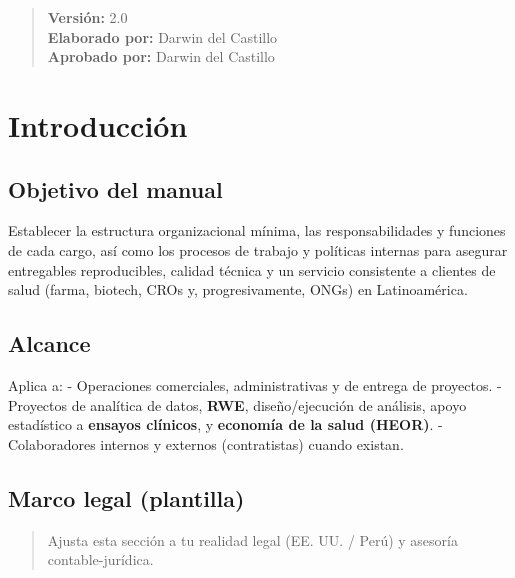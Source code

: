 \documentclass[
  spanish,
]{article}
\begin{document}
\maketitle

\renewcommand*\contentsname{Tabla de contenidos}
{
\hypersetup{linkcolor=yachaypetroleo}
\setcounter{tocdepth}{3}
\tableofcontents
}

\newpage

\begin{quote}
\textbf{Versión:} 2.0\\
\textbf{Elaborado por:} Darwin del Castillo\\
\textbf{Aprobado por:} Darwin del Castillo\\
\end{quote}

\newpage

\section{Introducción}\label{introducciuxf3n}

\subsection{Objetivo del manual}\label{objetivo-del-manual}

Establecer la estructura organizacional mínima, las responsabilidades y
funciones de cada cargo, así como los procesos de trabajo y políticas
internas para asegurar entregables reproducibles, calidad técnica y un
servicio consistente a clientes de salud (farma, biotech, CROs y,
progresivamente, ONGs) en Latinoamérica.

\subsection{Alcance}\label{alcance}

Aplica a: - Operaciones comerciales, administrativas y de entrega de
proyectos. - Proyectos de analítica de datos, \textbf{RWE},
diseño/ejecución de análisis, apoyo estadístico a \textbf{ensayos
clínicos}, y \textbf{economía de la salud (HEOR)}. - Colaboradores
internos y externos (contratistas) cuando existan.

\subsection{Marco legal (plantilla)}\label{marco-legal-plantilla}

\begin{quote}
Ajusta esta sección a tu realidad legal (EE. UU. / Perú) y asesoría
contable-jurídica.
\end{quote}
\end{document}
